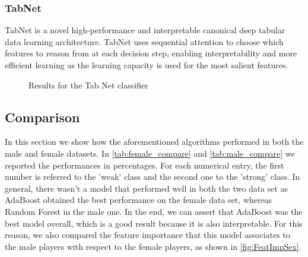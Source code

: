 \subsubsection{TabNet}
TabNet \cite{arik2020tabnet} is a novel high-performance and interpretable canonical deep tabular data learning architecture. TabNet uses sequential attention to choose which features to reason from at each decision step, enabling interpretability and more efficient learning as the learning capacity is used for the most salient features.
\begin{figure}[H]
    \centering
    \caption{Results for the Tab Net classifier}
    \label{fig:TNResults}
\end{figure}

\subsection{Comparison} \label{subsect:comparison}
In this section we show how the aforementioned algorithms performed in both the male and female datasets. In \autoref{tab:female_compare} and \autoref{tab:male_compare} we reported the performances in percentages. For each numerical entry, the first number is referred to the 'weak' class and the second one to the 'strong' class. In general, there wasn't a model that performed well in both the two data set as AdaBoost obtained the best performance on the female data set, whereas Random Forest in the male one. In the end, we can assert that AdaBoost was the best model overall, which is a good result because it is also interpretable. For this reason, we also compared the feature importance that this model associates to the male players with respect to the female players, as shown in \autoref{fig:FeatImpSex}.

